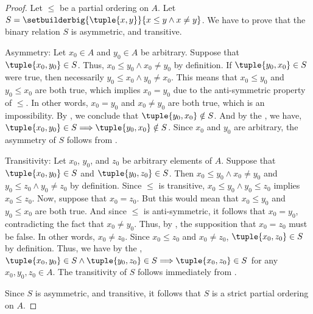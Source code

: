 \begin{proof}
    Let \( \leq \) be a partial ordering on \( A \). Let \( S = \setbuilderbig{\tuple{x,y}}{x \leq y \land x \neq y} \).
    We have to prove that the binary relation \( S \) is asymmetric, and transitive.

    \vspace{0.3cm}
    \noindent
    Asymmetry: Let \( x_{0} \in A \) and \( y_{0} \in A \) be arbitrary. Suppose that \( \tuple{x_{0}, y_{0}} \in S \). Thus,
    \( x_{0} \leq y_{0} \land x_{0} \neq y_{0} \) by definition. If \( \tuple{y_{0},x_{0}} \in S \) were true, then necessarily
    \( y_{0} \leq x_{0} \land y_{0} \neq x_{0} \). This means that \( x_{0} \leq y_{0} \) and \( y_{0} \leq x_{0} \) are both
    true, which implies \( x_{0} = y_{0} \) due to the anti-symmetric property of \( \leq \).
    In other words, \( x_{0} = y_{0} \) and \( x_{0} \neq y_{0} \) are both true, which is an impossibility.
    By , we conclude that \( \tuple{y_{0}, x_{0}} \notin S \). And by the ,
    we have, \( \tuple{x_{0},y_{0}} \in S {\implies} \tuple{y_{0}, x_{0}} \notin S \). Since \( x_{0} \) and \( y_{0} \)
    are arbitrary, the asymmetry of \( S \) follows from .

    \vspace{0.3cm}
    \noindent
    Transitivity: Let \( x_{0} \), \( y_{0} \), and \( z_{0} \) be arbitrary elements of \( A \). Suppose that \( \tuple{x_{0},y_{0}} \in S \)
    and \( \tuple{y_{0},z_{0}} \in S \). Then \( x_{0} \leq y_{0} \land x_{0} \neq y_{0} \) and \( y_{0} \leq z_{0} \land y_{0} \neq z_{0} \)
    by definition. Since \( \leq \) is transitive, \( x_{0} \leq y_{0} \land y_{0} \leq z_{0} \) implies \( x_{0} \leq z_{0} \). Now, suppose
    that \( x_{0} = z_{0} \). But this would mean that \( x_{0} \leq y_{0} \) and \( y_{0} \leq x_{0} \) are both true. And since \( \leq \)
    is anti-symmetric, it follows that \( x_{0} = y_{0} \), contradicting the fact that \( x_{0} \neq y_{0} \). Thus, by ,
    the supposition that \( x_{0} = z_{0} \) must be false. In other words, \( x_{0} \neq z_{0} \). Since \( x_{0} \leq z_{0} \) and
    \( x_{0} \neq z_{0} \), \( \tuple{x_{0},z_{0}} \in S \) by definition. Thus, we have by the ,
    \( \tuple{x_{0},y_{0}} \in S \land \tuple{y_{0},z_{0}} \in S {\implies} \tuple{x_{0},z_{0}} \in S \) for any \( x_{0}, y_{0}, z_{0} \in A \).
    The transitivity of \( S \) follows immediately from .

    \vspace{0.3cm}
    \noindent
    Since \( S \) is asymmetric, and transitive, it follows that \( S \) is a strict partial ordering on \( A \).
\end{proof}

